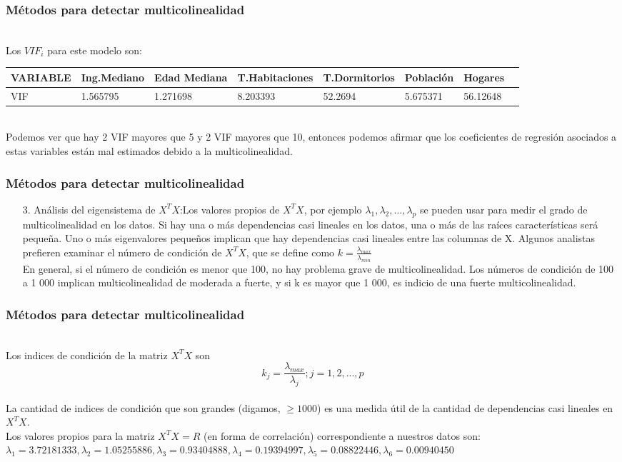 \documentclass[12pt]{beamer}
\begin{document}
\begin{frame}
\frametitle{Métodos para detectar multicolinealidad}
~\\Los $VIF_{i}$ para este modelo son:
~\\\begin{tabular}{llllllll}
\hline 
VARIABLE & Ing.Mediano & Edad Mediana & T.Habitaciones & T.Dormitorios & Población & Hogares \\ 
\hline 
VIF & 1.565795 & 1.271698 & 8.203393 & 52.2694 & 5.675371 & 56.12648 & \\ 
\hline 
\end{tabular} 
~\\Podemos ver que hay 2 VIF mayores que 5 y 2 VIF mayores que 10, entonces podemos afirmar que los coeficientes de regresión asociados a estas variables están mal estimados debido a la multicolinealidad.
\end{frame}

\begin{frame}
\frametitle{Métodos para detectar multicolinealidad}
\begin{itemize}
\item[3.]Análisis del eigensistema de $X^{T}X$:Los valores propios de $X^{T}X$, por ejemplo $\lambda_{1},\lambda_{2},...,\lambda_{p}$ se pueden usar para medir el grado de multicolinealidad en los datos. Si hay una o más dependencias casi lineales en los datos, una o más de las raíces características será pequeña. Uno o más eigenvalores pequeños implican que hay dependencias casi lineales entre las columnas de X. Algunos analistas prefieren examinar el número de condición de $X^{T}X$, que se define como $k=\frac{\lambda_{max}}{\lambda_{min}}$
~\\En general, si el número de condición es menor que 100, no hay problema grave de multicolinealidad. Los números de condición de 100 a 1 000 implican multicolinealidad de moderada a fuerte, y si k es mayor que 1 000, es indicio de una fuerte multicolinealidad.
\end{itemize}
\end{frame}

\begin{frame}
\frametitle{Métodos para detectar multicolinealidad}
~\\Los indices de condición de la matriz $X^{T}X$ son
~\\$$k_{j}=\frac{\lambda_{max}}{\lambda_{j}} ; j=1,2,...,p$$
~\\La cantidad de indices de condición que son grandes (digamos, $\geq 1000$) es una medida útil de la cantidad de dependencias casi lineales en $X^{T}X$.
~\\Los valores propios para la matriz $X^{T}X=R$ (en forma de correlación) correspondiente a nuestros datos son:
~\\$\lambda_{1}=3.72181333,\lambda_{2}=1.05255886,\lambda_{3}=0.93404888,\lambda_{4}=0.19394997,\lambda_{5}=0.08822446,\lambda_{6}=0.00940450$
\end{frame}
\end{document}
